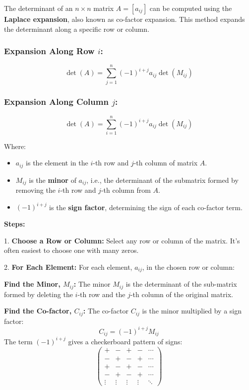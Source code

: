 The determinant of an \( n \times n \) matrix \( A = [a_{ij}] \) can be 
computed using the \textbf{Laplace expansion}, also known as co-factor expansion. 
This method expands the determinant along a specific row or column.

\subsubsection*{Expansion Along Row \( i \):}

\[
\det(A) = \sum_{j=1}^{n} {(-1)}^{i+j} a_{ij} \det(M_{ij})
\]

\subsubsection*{Expansion Along Column \( j \):}

\[
\det(A) = \sum_{i=1}^{n} {(-1)}^{i+j} a_{ij} \det(M_{ij})
\]

Where:

\begin{itemize}
    \item \( a_{ij} \) is the element in the \( i \)-th row and \( j \)-th column of matrix \( A \).
    \item \( M_{ij} \) is the \textbf{minor} of \( a_{ij} \), i.e., the determinant of the submatrix formed by removing the \( i \)-th row and \( j \)-th column from \( A \).
    \item \( {(-1)}^{i+j} \) is the \textbf{sign factor}, determining the sign of each co-factor term.
\end{itemize}

\textbf{Steps:}

1.\textbf{ Choose a Row or Column:} Select any row or column of the matrix.  It's often easiest to choose one with many zeros.

 2.\textbf{ For Each Element:} For each element, \(a_{ij}\), in the chosen row or column:

    \textbf{Find the Minor, \(M_{ij}\):} The minor \(M_{ij}\) is the determinant of the sub-matrix formed by deleting the 
    \indent \(i\)-th row and the \(j\)-th column of the original matrix.

    \textbf{Find the Co-factor, \(C_{ij}\):} The co-factor \(C_{ij}\) is the minor multiplied by a sign factor:
        \[
        C_{ij} = {(-1)}^{i+j} M_{ij}
        \]
        The term  \({(-1)}^{i+j}\)  gives a checkerboard pattern of signs:
        \[
        \begin{pmatrix}
        + & - & + & - & \cdots \\
        - & + & - & + & \cdots \\
        + & - & + & - & \cdots \\
        - & + & - & + & \cdots \\
        \vdots & \vdots & \vdots & \vdots & \ddots
        \end{pmatrix}
        \]

